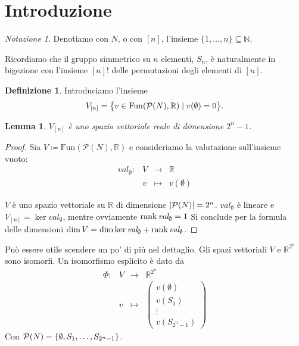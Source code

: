 \documentclass[a4paper,11pt]{article}
\theoremstyle{definition}				%
\newtheorem{definizione}{Definizione}%
\theoremstyle{remark}
\newtheorem*{notazione}{Notazione}
\theoremstyle{plain}
\newtheorem{lemma}{Lemma}%
\newcommand{\R}{\mathbb{R}}										%
\begin{document}
	\begin{abstract}
		In questo documento daremo la dimostrazione del Teorema di Shapley vista durante la lezione del xx/05/2023.
		
		Per dimostrare il teorema serviranno diversi risultati preliminari, non tutti visti a lezione.
		
		Documento scritto e redatto in \LaTeX{} da Andrea Marino.
	\end{abstract}
	
	\section*{Introduzione}
	\begin{notazione}
		Denotiamo con $N$, o con $[n]$, l'insieme $\{1,\dots,n\}\subseteq\mathbb{N}$.
		
		Ricordiamo che il gruppo simmetrico su $n$ elementi, $S_n$, è naturalmente in bigezione con l'insieme $[n]!$ delle permutazioni degli elementi di $[n]$.
	\end{notazione}
	
	\begin{definizione}
		Introduciamo l'insieme 
		\[
			V_{[n]}=\qty\big{v\in\mathrm{Fun}\qty(\mathcal{P}(N),\R)\mid v(\emptyset)=0}.
		\]
	\end{definizione}
	
	\begin{lemma}\label{lemma:vectorspace}
		$V_{[n]}$ è uno spazio vettoriale reale di dimensione $2^n-1$.
	\end{lemma}
	\begin{proof}
		Sia $V\coloneqq\mathrm{Fun}\left(\mathcal{P}(N),\R\right)$ e consideriamo la valutazione sull'insieme vuoto: 
		\[
			\begin{array}{rccl}
				\mathit{val}_{\emptyset}\colon	& V	& \longrightarrow & \R\\
				 & v & \longmapsto & v\left(\emptyset\right)
			\end{array}	
		\]
		
		$V$ è uno spazio vettoriale su $\R$ di dimensione $\qty|\mathcal{P}(N)|=2^n$. $\mathit{val}_{\emptyset}$ è lineare e $V_{[n]}=\ker\textit{val}_{\emptyset}$, mentre ovviamente $\rank \textit{val}_{\emptyset}=1$ Si conclude per la formula delle dimensioni $\dim V = \dim\ker\textit{val}_{\emptyset}+\rank\textit{val}_{\emptyset}$.
	\end{proof}
	
	Può essere utile scendere un po' di più nel dettaglio. Gli spazi vettoriali $V$ e $\R^{2^n}$ sono isomorfi. Un isomorfismo esplicito è dato da
	\[
		\begin{array}{rccc}
			\Phi\colon & V & \longrightarrow & \R^{2^n}\\
			 & v & \longmapsto & \begin{pmatrix}
			 v(\emptyset)\\
			 v(S_1)\\
			 \vdots\\
			 v(S_{2^n-1})
			 \end{pmatrix}
		\end{array}
	\]
	Con $\mathcal{P}(N)=\qty{\emptyset,S_1,\dots,S_{2^n-1}}$.
	
\end{document}
